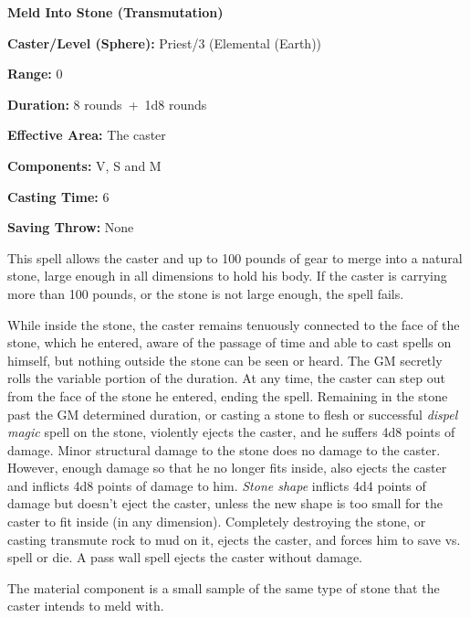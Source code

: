 \begin{multicols}{2}
\noindent
\begin{minipage}{\columnwidth}

\noindent \textbf{Meld Into Stone (Transmutation)}

\noindent \textbf{Caster/Level (Sphere):} Priest/3 (Elemental (Earth))

\noindent \textbf{Range:} 0

\noindent \textbf{Duration:} 8 rounds~+~1d8 rounds

\noindent \textbf{Effective Area:} The caster

\noindent \textbf{Components:} V, S and M

\noindent \textbf{Casting Time:} 6

\noindent \textbf{Saving Throw:} None

\end{minipage}

This spell allows the caster and up to 100 pounds of gear to merge into a natural stone, large enough in all dimensions to hold his body.  If the caster is carrying more than 100 pounds, or the stone is not large enough, the spell fails.  

While inside the stone, the caster remains tenuously connected to the face of the stone, which he entered, aware of the passage of time and able to cast spells on himself, but nothing outside the stone can be seen or heard.  The GM secretly rolls the variable portion of the duration.  At any time, the caster can step out from the face of the stone he entered, ending the spell.  Remaining in the stone past the GM determined duration, or casting a stone to flesh or successful \textit{dispel magic} spell on the stone, violently ejects the caster, and he suffers 4d8 points of damage.  Minor structural damage to the stone does no damage to the caster.  However, enough damage so that he no longer fits inside, also ejects the caster and inflicts 4d8 points of damage to him.  \textit{Stone shape} inflicts 4d4 points of damage but doesn't eject the caster, unless the new shape is too small for the caster to fit inside (in any dimension).  Completely destroying the stone, or casting transmute rock to mud on it, ejects the caster, and forces him to save vs. spell or die.  A pass wall spell ejects the caster without damage.

The material component is a small sample of the same type of stone that the caster intends to meld with.

\vspace{1em}


\end{multicols}
